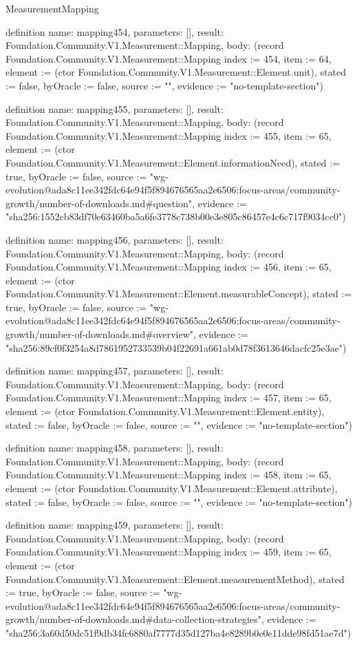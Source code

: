 \begin{lexlean}{MeasurementMapping}
\begin{semanticmodule}
definition{
  name: mapping454,
  parameters: [],
  result: Foundation.Community.V1.Measurement::Mapping,
  body: (record Foundation.Community.V1.Measurement::Mapping {index := 454, item := 64, element := (ctor Foundation.Community.V1.Measurement::Element.unit), stated := false, byOracle := false, source := "", evidence := "no-template-section"})
}

definition{
  name: mapping455,
  parameters: [],
  result: Foundation.Community.V1.Measurement::Mapping,
  body: (record Foundation.Community.V1.Measurement::Mapping {index := 455, item := 65, element := (ctor Foundation.Community.V1.Measurement::Element.informationNeed), stated := true, byOracle := false, source := "wg-evolution@ada8c11ee342fdc64e94f5f894676565aa2e6506:focus-areas/community-growth/number-of-downloads.md#question", evidence := "sha256:1552cb83df70e63460ba5a6fe3778c738b00e3e805c86457e4c6c717f9034cc0"})
}

definition{
  name: mapping456,
  parameters: [],
  result: Foundation.Community.V1.Measurement::Mapping,
  body: (record Foundation.Community.V1.Measurement::Mapping {index := 456, item := 65, element := (ctor Foundation.Community.V1.Measurement::Element.measurableConcept), stated := true, byOracle := false, source := "wg-evolution@ada8c11ee342fdc64e94f5f894676565aa2e6506:focus-areas/community-growth/number-of-downloads.md#overview", evidence := "sha256:89cf0f3254a8d7861952733539b04f22691a661ab0d78f3613646dacfc25e3ae"})
}

definition{
  name: mapping457,
  parameters: [],
  result: Foundation.Community.V1.Measurement::Mapping,
  body: (record Foundation.Community.V1.Measurement::Mapping {index := 457, item := 65, element := (ctor Foundation.Community.V1.Measurement::Element.entity), stated := false, byOracle := false, source := "", evidence := "no-template-section"})
}

definition{
  name: mapping458,
  parameters: [],
  result: Foundation.Community.V1.Measurement::Mapping,
  body: (record Foundation.Community.V1.Measurement::Mapping {index := 458, item := 65, element := (ctor Foundation.Community.V1.Measurement::Element.attribute), stated := false, byOracle := false, source := "", evidence := "no-template-section"})
}

definition{
  name: mapping459,
  parameters: [],
  result: Foundation.Community.V1.Measurement::Mapping,
  body: (record Foundation.Community.V1.Measurement::Mapping {index := 459, item := 65, element := (ctor Foundation.Community.V1.Measurement::Element.measurementMethod), stated := true, byOracle := false, source := "wg-evolution@ada8c11ee342fdc64e94f5f894676565aa2e6506:focus-areas/community-growth/number-of-downloads.md#data-collection-strategies", evidence := "sha256:3a60d50dc51f9db34fc6880af7777d35d127ba4e8289b0e0e11dde98fd51ae7d"})
}


\end{semanticmodule}
\end{lexlean}
